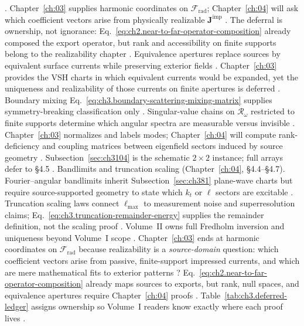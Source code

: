 \cite{stratton1941}. Chapter~\ref{ch:03} supplies harmonic coordinates on \(\mathcal{F}_{\mathrm{rad}}\); Chapter~\ref{ch:04}
will ask which coefficient vectors arise from physically realizable \(\mathbf{J}^{\mathrm{imp}}\) \cite{harrington2001}. The deferral
is ownership, not ignorance: Eq.~\eqref{eq:ch2.near-to-far-operator-composition} already composed the export operator, but rank and accessibility on
finite supports belong to the realizability chapter \cite{devaney2004}.
Equivalence apertures replace sources by equivalent surface currents while preserving exterior fields \cite{stratton1941}. Chapter~\ref{ch:03}
provides the VSH charts in which equivalent currents would be expanded, yet the uniqueness and realizability of those currents on finite apertures
is deferred \cite{harrington2001}. Boundary mixing Eq.~\eqref{eq:ch3.boundary-scattering-mixing-matrix} supplies symmetry-breaking classification
only \cite{jackson1999}.
Singular-value chains on \(\mathcal{R}_\omega\) restricted to finite supports determine which angular spectra are measurable versus invisible
\cite{devaney2004}. Chapter~\ref{ch:03} normalizes and labels modes; Chapter~\ref{ch:04} will compute rank-deficiency and coupling
matrices between eigenfield sectors induced by source geometry \cite{harrington2001}. Subsection~\ref{sec:ch3104} is the schematic
\(2\times2\) instance; full arrays defer to §4.5 \cite{harrington2001}.
Bandlimits and truncation scaling (Chapter~\ref{ch:04}, §4.4--§4.7). Fourier--angular bandlimits inherit Subsection~\ref{sec:ch381} plane-wave charts but require source-supported geometry to state which \(k_{t}\) or
\(\ell\) sectors are excitable \cite{jackson1999}. Truncation scaling laws connect \(\ell_{\max}\) to measurement noise
and superresolution claims; Eq.~\eqref{eq:ch3.truncation-remainder-energy} supplies the remainder definition, not the scaling proof
\cite{harrington2001}. Volume~II owns full Fredholm inversion and uniqueness beyond Volume~I scope \cite{devaney2004}.
Chapter~\ref{ch:03} ends at harmonic coordinates on \(\mathcal{F}_{\mathrm{rad}}\) because realizability is a \emph{source-domain} question:
which coefficient vectors arise from passive, finite-support impressed currents, and which are mere mathematical fits to exterior patterns
\cite{stratton1941}? Eq.~\eqref{eq:ch2.near-to-far-operator-composition} already maps sources to exports, but rank,
null spaces, and equivalence apertures require Chapter~\ref{ch:04} proofs \cite{harrington2001}. Table~\ref{tab:ch3.deferred-ledger}
assigns ownership so Volume~I readers know exactly where each proof lives \cite{devaney2004}.
